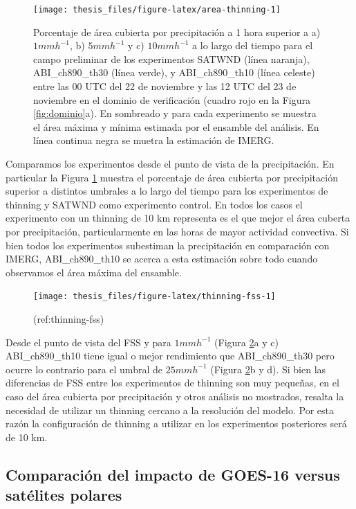 \documentclass[12pt,oneside]{reedthesis}
\begin{document}
\begin{figure}
\texttt{[image: thesis\_files/figure-latex/area-thinning-1]} \caption{Porcentaje de área cubierta por precipitación a 1 hora superior a a) \(1 mmh^{-1}\), b) \(5 mmh^{-1}\) y c) \(10 mmh^{-1}\) a lo largo del tiempo para el campo preliminar de los experimentos SATWND (línea naranja), ABI\_ch890\_th30 (línea verde), y ABI\_ch890\_th10 (línea celeste) entre las 00 UTC del 22 de noviembre y las 12 UTC del 23 de noviembre en el dominio de verificación (cuadro rojo en la Figura \ref{fig:dominio}a). En sombreado y para cada experimento se muestra el área máxima y mínima estimada por el ensamble del análisis. En línea continua negra se muetra la estimación de IMERG.}\label{fig:area-thinning}
\end{figure}
Comparamos los experimentos desde el punto de vista de la precipitación. En particular la Figura \ref{fig:area-thinning} muestra el porcentaje de área cubierta por precipitación superior a distintos umbrales a lo largo del tiempo para los experimentos de thinning y SATWND como experimento control. En todos los casos el experimento con un thinning de 10 km representa es el que mejor el área cuberta por precipitación, particularmente en las horas de mayor actividad convectiva. Si bien todos los experimentos subestiman la precipitación en comparación con IMERG, ABI\_ch890\_th10 se acerca a esta estimación sobre todo cuando observamos el área máxima del ensamble.
\begin{figure}
\texttt{[image: thesis\_files/figure-latex/thinning-fss-1]} \caption{(ref:thinning-fss)}\label{fig:thinning-fss}
\end{figure}
Desde el punto de vista del FSS y para \(1 mm h^{-1}\) (Figura \ref{fig:thinning-fss}a y c) ABI\_ch890\_th10 tiene igual o mejor rendimiento que ABI\_ch890\_th30 pero ocurre lo contrario para el umbral de \(25 mm h^{-1}\) (Figura \ref{fig:thinning-fss}b y d). Si bien las diferencias de FSS entre los experimentos de thinning son muy pequeñas, en el caso del área cubierta por precipitación y otros análisis no mostrados, resalta la necesidad de utilizar un thinning cercano a la resolución del modelo. Por esta razón la configuración de thinning a utilizar en los experimentos posteriores será de 10 km.

\hypertarget{comparaciuxf3n-del-impacto-de-goes-16-versus-satuxe9lites-polares}{%
\subsection{Comparación del impacto de GOES-16 versus satélites polares}\label{comparaciuxf3n-del-impacto-de-goes-16-versus-satuxe9lites-polares}}
\end{document}
